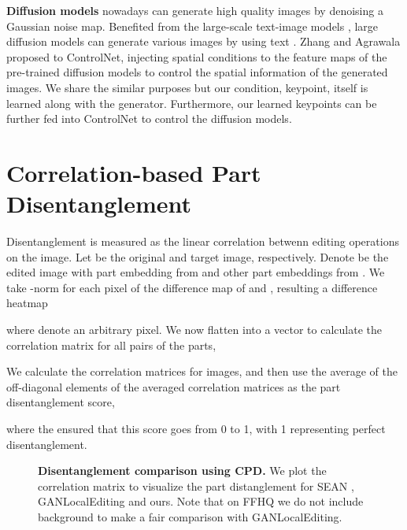 \documentclass[10pt, conference, compsocconf]{IEEEtran}
\begin{document}
\textbf{Diffusion models} \cite{ho2020denoising, dhariwal2021diffusion} nowadays can generate high quality images by denoising a Gaussian noise map. Benefited from the large-scale text-image models \cite{radford2021learning}, large diffusion models can generate various images by using text \cite{ramesh2021zero, saharia2022photorealistic, rombach2022high}. Zhang and Agrawala \cite{zhang2023adding} proposed to ControlNet, injecting spatial conditions to the feature maps of the pre-trained diffusion models to control the spatial information of the generated images. We share the similar purposes but our condition, keypoint, itself is learned along with the generator. Furthermore, our learned keypoints can be further fed into ControlNet to control the diffusion models. \section{Correlation-based Part Disentanglement} \label{supp:cpd}
Disentanglement is measured as the linear correlation betwenn editing operations on the image. Let  be the original and target image, respectively. Denote  be the edited image with part embedding  from  and other part embeddings from . We take -norm for each pixel of the difference map of  and , resulting a difference heatmap

where  denote an arbitrary pixel. We now flatten  into a vector  to calculate the correlation matrix  for all pairs  of the  parts,

We calculate the correlation matrices for  images, and then use the average of the off-diagonal elements of the averaged correlation matrices as the part disentanglement score,

where the  ensured that this score goes from 0 to 1, with 1 representing perfect disentanglement.

 \begin{figure*}[t]
 \caption{\textbf{Disentanglement comparison using CPD.} We plot the correlation matrix to visualize the part distanglement for SEAN \cite{zhu2020sean}, GANLocalEditing \cite{collins2020editing} and ours. Note that on FFHQ we do not include background to make a fair comparison with GANLocalEditing.
 }
 \label{fig:correlation}
 \end{figure*}
\end{document}
